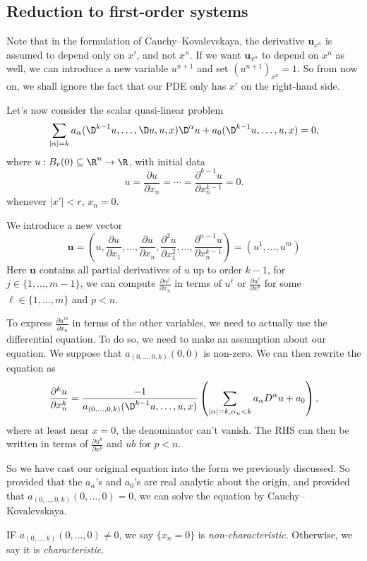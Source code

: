 \documentclass[a4paper]{article}
\begin{document}
\subsection{Reduction to first-order systems}
Note that in the formulation of Cauchy--Kovalevskaya, the derivative $\mathbf{u}_{x^n}$ is assumed to depend only on $x'$, and not $x^n$. If we want $\mathbf{u}_{x^n}$ to depend on $x^n$ as well, we can introduce a new variable $u^{n + 1}$ and set $(u^{n + 1})_{x^n} = 1$. So from now on, we shall ignore the fact that our PDE only has $x'$ on the right-hand side.

Let's now consider the scalar quasi-linear problem
\[
  \sum_{|\alpha| = k} a_\alpha(\D^{k - 1} u, \ldots, \D u, u, x) \D^\alpha u + a_0(\D^{k - 1}u, \ldots, u, x) = 0,
\]
where $u: B_r(0) \subseteq \R^n \to \R$, with initial data
\[
  u = \frac{\partial u}{\partial x_n} = \cdots = \frac{\partial^{k - 1} u}{\partial x_n^{k - 1}} = 0.
\]
whenever $|x'| < r$, $x_n = 0$.

We introduce a new vector
\[
  \mathbf{u} = \left(u, \frac{\partial u}{\partial x_1}, \ldots, \frac{\partial u}{\partial x_n}, \frac{\partial^2 u}{\partial x_1^2}, \ldots, \frac{\partial^{n - 1} u}{\partial x_n^{k - 1}}\right) = (u^1, \ldots, u^m)
\]
Here $\mathbf{u}$ contains all partial derivatives of $u$ up to order $k - 1$, for $j \in \{1, \ldots, m - 1\}$, we can compute $\frac{\partial u^j}{\partial x_n}$ in terms of $u^\ell$ or $\frac{\partial u^\ell}{\partial x^p}$ for some $\ell \in \{1, \ldots, m\}$ and $p < n$.

To express $\frac{\partial u^m}{\partial x_n}$ in terms of the other variables, we need to actually use the differential equation. To do so, we need to make an assumption about our equation. We suppose that $a_{(0, \ldots, 0, k)}(0, 0)$ is non-zero. We can then rewrite the equation as
\[
  \frac{\partial^k u}{\partial x_n^k} = \frac{-1}{a_{(0, \ldots, 0, k)}(\D^{k - 1}u, \ldots, u, x)} \left(\sum_{|\alpha| = k, \alpha_n < k} a_\alpha D^\alpha u + a_0\right),
\]
where at least near $x = 0$, the denominator can't vanish. The RHS can then be written in terms of $\frac{\partial u^k}{\partial x^p}$ and $ub$ for $p < n$.

So we have cast our original equation into the form we previously discussed. So provided that the $a_\alpha$'s and $a_0$'s are real analytic about the origin, and provided that $a_{(0, \ldots, 0, k)}(0, \ldots, 0) = 0$, we can solve the equation by Cauchy--Kovalevskaya.

IF $a_{(0, \ldots, k)} (0, \ldots, 0) \not= 0$, we say $\{x_n = 0\}$ is \emph{non-characteristic}. Otherwise, we say it is \emph{characteristic}.
\end{document}
